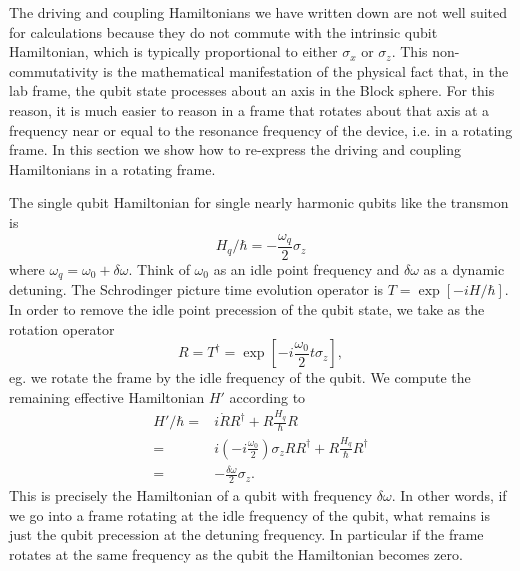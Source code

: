 
The driving and coupling Hamiltonians we have written down are not well suited for calculations because they do not commute with the intrinsic qubit Hamiltonian, which is typically proportional to either $\sigma_x$ or $\sigma_z$.
This non-commutativity is the mathematical manifestation of the physical fact that, in the lab frame, the qubit state processes about an axis in the Block sphere.
For this reason, it is much easier to reason in a frame that rotates about that axis at a frequency near or equal to the resonance frequency of the device, i.e. in a rotating frame.
In this section we show how to re-express the driving and coupling Hamiltonians in a rotating frame.

The single qubit Hamiltonian for single nearly harmonic qubits like the transmon is \begin{equation}
H_q/\hbar = -\frac{\omega_q}{2}\sigma_z \end{equation}
where $\omega_q = \omega_0 + \delta\omega$. Think of $\omega_0$ as an idle point frequency and $\delta \omega$ as a dynamic detuning.
The Schrodinger picture time evolution operator is $T=\exp \left[-i H/\hbar \right]$.
In order to remove the idle point precession of the qubit state, we take as the rotation operator \begin{equation}
R = T^{\dagger} = \exp \left[ -i \frac{\omega_0}{2} t \sigma_z \right], \end{equation}
eg. we rotate the frame by the idle frequency of the qubit.
We compute the remaining effective Hamiltonian $H'$ according to 
\begin{align}
  H'/\hbar
  =& i\dot{R}R^{\dagger} + R \frac{H_q}{\hbar} R \nonumber \\
  =& i \left(-i \frac{\omega_0}{2} \right)\sigma_z RR^{\dagger} + R\frac{H_q}{\hbar}R^{\dagger} \nonumber \\
  =& -\frac{\delta\omega}{2}\sigma_z.
\end{align}
This is precisely the Hamiltonian of a qubit with frequency $\delta\omega$.
In other words, if we go into a frame rotating at the idle frequency of the qubit, what remains is just the qubit precession at the detuning frequency.
In particular if the frame rotates at the same frequency as the qubit the Hamiltonian becomes zero.


